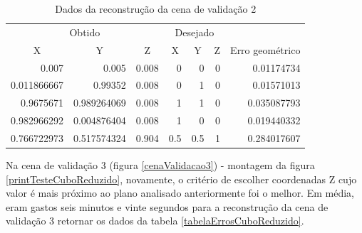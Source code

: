 		\begin{table}
			\caption{Dados da reconstrução da cena de validação 2}
			\label{tabelaErrosPiramide}
			\begin{center}
				\begin{tabular}{r r r | r r r | r}
					\hline
					\multicolumn{3}{c}{Obtido} & \multicolumn{3}{c}{Desejado}\\
					\cline{1-6}
					\multicolumn{1}{c}{X} & \multicolumn{1}{c}{Y} & \multicolumn{1}{c}{Z} & \multicolumn{1}{c}{X} & \multicolumn{1}{c}{Y} & \multicolumn{1}{c}{Z} & \multicolumn{1}{c}{Erro geométrico}\\
					\hline			
					0.007					&			0.005					&		0.008		&		0			&		0			&		0		&		0.01174734\\
					0.011866667		&			0.99352				&		0.008		&		0			&		1			&		0		&		0.01571013\\
					0.9675671			&			0.989264069		&		0.008		&		1			&		1			&		0		&		0.035087793\\
					0.982966292		& 		0.004876404		&		0.008		&		1			&		0			&		0		&		0.019440332\\
					0.766722973		&			0.517574324		&		0.904		&		0.5		&		0.5		&		1		&		0.284017607\\
					\hline
				\end{tabular}
			\end{center}
		\end{table}
		
		Na cena de validação 3 (figura \ref{cenaValidacao3}) - montagem da figura \ref{printTesteCuboReduzido}, novamente, o critério de escolher coordenadas Z cujo valor é mais próximo ao plano analisado anteriormente foi o melhor. Em média, eram gastos seis minutos e vinte segundos para a reconstrução da cena de validação 3 retornar os dados da tabela \ref{tabelaErrosCuboReduzido}.
		
